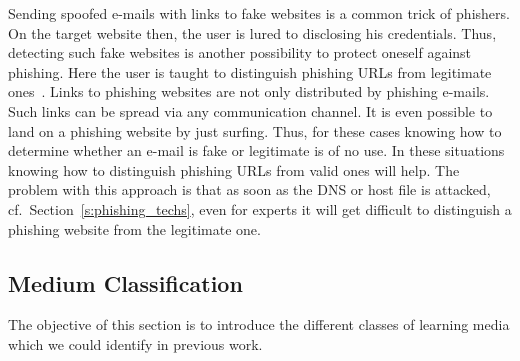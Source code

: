 \begin{description}[leftmargin=0cm]
	\item[URL Based Knowledge] Sending spoofed e-mails with links to fake websites is a common trick of phishers. On the target website then, the user is lured to disclosing his credentials. Thus, detecting such fake websites is another possibility to protect oneself against phishing. Here the user is taught to distinguish phishing URLs from legitimate ones~\cite{sheng2007antiphishingphil, arachchilage2012designing}. Links to phishing websites are not only distributed by phishing e-mails. Such links can be spread via any communication channel. It is even possible to land on a phishing website by just surfing. Thus, for these cases knowing how to determine whether an e-mail is fake or legitimate is of no use. In these situations knowing how to distinguish phishing URLs from valid ones will help. The problem with this approach is that as soon as the DNS or host file is attacked, cf.~Section~\ref{s:phishing_techs}, even for experts it will get difficult to distinguish a phishing website from the legitimate one.
\end{description}



\subsection{Medium Classification}
The objective of this section is to introduce the different classes of learning media which we could identify in previous work.

